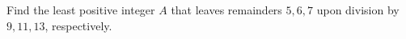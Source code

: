 Find the least positive integer $A$ that leaves remainders $5,6,7$ upon division by $9,11,13$, respectively.

